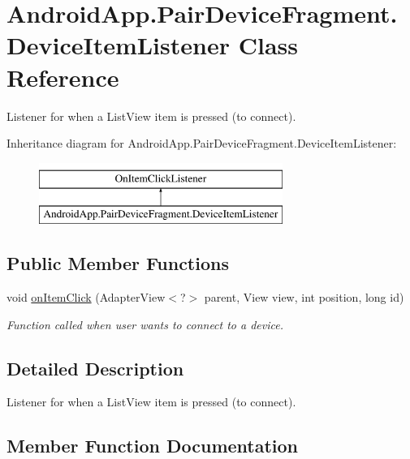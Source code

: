 \hypertarget{class_android_app_1_1_pair_device_fragment_1_1_device_item_listener}{}\section{Android\+App.\+Pair\+Device\+Fragment.\+Device\+Item\+Listener Class Reference}
\label{class_android_app_1_1_pair_device_fragment_1_1_device_item_listener}


Listener for when a List\+View item is pressed (to connect).  


Inheritance diagram for Android\+App.\+Pair\+Device\+Fragment.\+Device\+Item\+Listener\+:\begin{figure}[H]
\begin{center}
\leavevmode
\includegraphics[height=2.000000cm]{class_android_app_1_1_pair_device_fragment_1_1_device_item_listener}
\end{center}
\end{figure}
\subsection*{Public Member Functions}
\begin{DoxyCompactItemize}
\item 
void \hyperlink{class_android_app_1_1_pair_device_fragment_1_1_device_item_listener_a6a396ee11bf3af843829045ccb7ffd5c}{on\+Item\+Click} (Adapter\+View$<$?$>$ parent, View view, int position, long id)
\begin{DoxyCompactList}\small\item\em Function called when user wants to connect to a device. \end{DoxyCompactList}\end{DoxyCompactItemize}


\subsection{Detailed Description}
Listener for when a List\+View item is pressed (to connect). 

\subsection{Member Function Documentation}
\mbox{\label{class_android_app_1_1_pair_device_fragment_1_1_device_item_listener_a6a396ee11bf3af843829045ccb7ffd5c}} 
